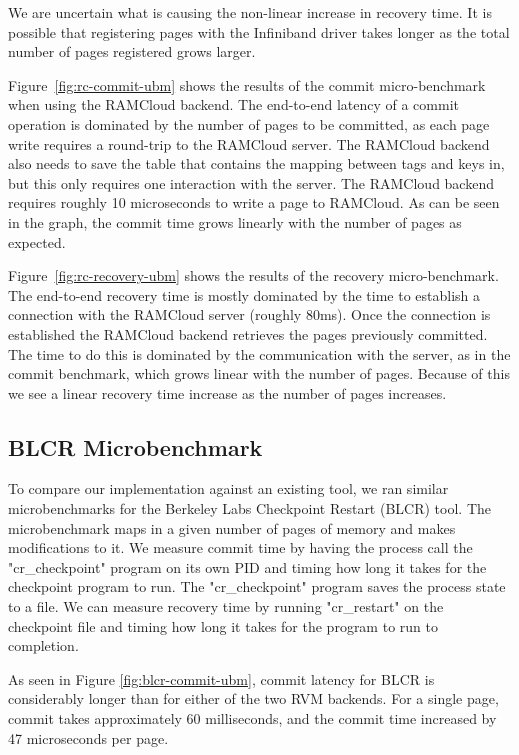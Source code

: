 We are uncertain what is causing the non-linear increase in recovery time.
It is possible that registering pages with the Infiniband driver takes
longer as the total number of pages registered grows larger.

Figure~\ref{fig:rc-commit-ubm} shows the results of the commit micro-benchmark when using the RAMCloud backend. 
The end-to-end latency of a commit operation is dominated by the number of pages to be committed, as each page write requires a round-trip to the RAMCloud server.
The RAMCloud backend also needs to save the table that contains the mapping between tags and keys in, but this only requires one interaction with the server.
The RAMCloud backend requires roughly 10 microseconds to write a page to RAMCloud. As can be seen in the graph, the commit time grows linearly with the number of pages as expected.

Figure~\ref{fig:rc-recovery-ubm} shows the results of the recovery micro-benchmark.
The end-to-end recovery time is mostly dominated by the time to establish a connection with the RAMCloud server (roughly 80ms).
Once the connection is established the RAMCloud backend retrieves the pages previously committed. The time to do this is dominated by the communication with the server, as in the commit benchmark, which grows linear with the number of pages.
Because of this we see a linear recovery time increase as the number of pages increases.

\subsection{BLCR Microbenchmark}

To compare our implementation against an existing tool, we ran similar
microbenchmarks for the Berkeley Labs Checkpoint Restart (BLCR) tool.
The microbenchmark maps in a given number of pages of memory and makes
modifications to it. We measure commit time by having the process call the
"cr\_checkpoint" program on its own PID and timing how long it takes for the
checkpoint program to run. The "cr\_checkpoint" program saves the process state
to a file. We can measure recovery time by running "cr\_restart" on the
checkpoint file and timing how long it takes for the program to run to completion.

As seen in Figure \ref{fig:blcr-commit-ubm}, commit latency for BLCR is
considerably longer than for either of the two RVM backends. For a single page,
commit takes approximately 60 milliseconds, and the commit time increased by
47 microseconds per page.

